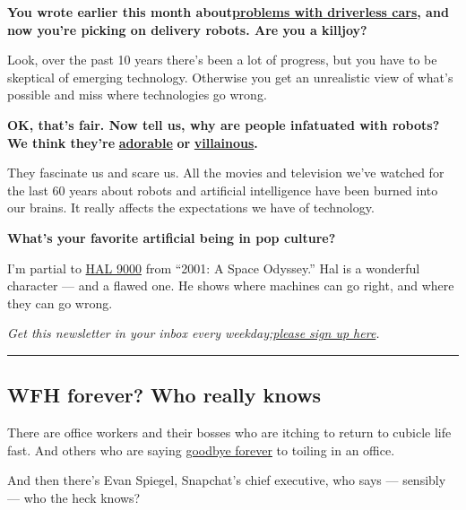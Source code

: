 \textbf{You wrote earlier this month
about\href{https://www.nytimes.com/2020/05/12/technology/self-driving-cars-coronavirus.html}{problems
with driverless cars}, and now you're picking on delivery robots. Are
you a killjoy?}

Look, over the past 10 years there's been a lot of progress, but you
have to be skeptical of emerging technology. Otherwise you get an
unrealistic view of what's possible and miss where technologies go
wrong.

\textbf{OK, that's fair. Now tell us, why are people infatuated with
robots? We think they're}
\textbf{\href{https://www.nytimes.com/2020/02/26/business/robots-retail-jobs.html}{adorable}}
\textbf{or}
\textbf{\href{https://www.nytimes.com/2020/04/08/movies/ai-humans-robots-technology.html}{villainous}.}

They fascinate us and scare us. All the movies and television we've
watched for the last 60 years about robots and artificial intelligence
have been burned into our brains. It really affects the expectations we
have of technology.

\textbf{What's your favorite artificial being in pop culture?}

I'm partial to
\href{https://www.nytimes.com/2018/03/30/movies/hal-2001-a-space-odyssey-voice-douglas-rain.html}{HAL
9000} from ``2001: A Space Odyssey.'' Hal is a wonderful character ---
and a flawed one. He shows where machines can go right, and where they
can go wrong.

\emph{Get this newsletter in your inbox every
weekday;}\href{https://www.nytimes.com/newsletters/signup/OT}{\emph{please
sign up here}}\emph{.}

\begin{center}\rule{0.5\linewidth}{\linethickness}\end{center}

\hypertarget{wfh-forever-who-really-knows}{%
\subsection{WFH forever? Who really
knows}\label{wfh-forever-who-really-knows}}

There are office workers and their bosses who are itching to return to
cubicle life fast. And others who are saying
\href{https://blog.twitter.com/en_us/topics/company/2020/keeping-our-employees-and-partners-safe-during-coronavirus.html}{goodbye
forever} to toiling in an office.

And then there's Evan Spiegel, Snapchat's chief executive, who says ---
sensibly --- who the heck knows?

